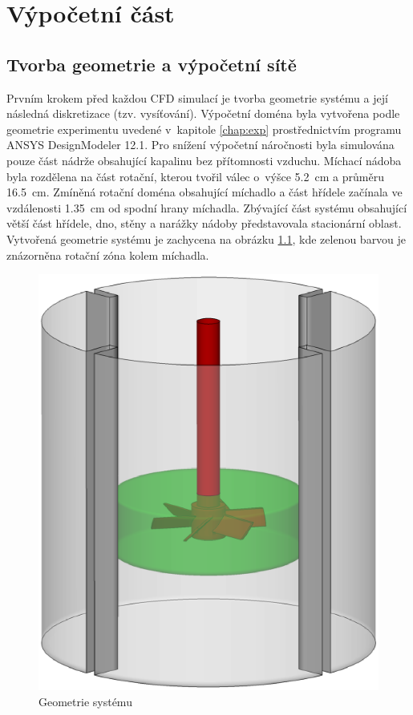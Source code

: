 \chapter{Výpočetní část}

\section{Tvorba geometrie a výpočetní sítě}

Prvním krokem před každou CFD simulací je tvorba geometrie systému a její následná diskretizace (tzv. vysíťování). Výpočetní doména byla vytvořena podle geometrie experimentu uvedené v~kapitole \ref{chap:exp} prostřednictvím programu ANSYS DesignModeler 12.1. Pro snížení výpočetní náročnosti byla simulována pouze část nádrže obsahující kapalinu bez přítomnosti vzduchu. Míchací nádoba byla rozdělena na část rotační, kterou tvořil válec o~výšce \SI{5.2}{\centi\meter} a průměru \SI{16.5}{\centi\meter}. Zmíněná rotační doména obsahující míchadlo a část hřídele začínala ve vzdálenosti \SI{1.35}{\centi\meter} od spodní hrany míchadla. Zbývající část systému obsahující větší část hřídele, dno, stěny a narážky nádoby představovala stacionární oblast. Vytvořená geometrie systému je zachycena na obrázku \ref{fig:geo}, kde zelenou barvou je znázorněna rotační zóna kolem míchadla. 

\begin{figure}[h!]
\centering
\includegraphics[scale=0.5]{images/geo.eps}
\caption{Geometrie systému}
\label{fig:geo}
\end{figure} 

